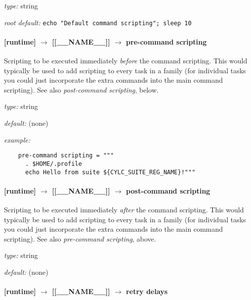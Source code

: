 \begin{myitemize}
\item {\em type:} string
\item {\em root default:} \lstinline=echo "Default command scripting"; sleep 10=
\end{myitemize}


\paragraph[pre-command scripting]{ [runtime] $\rightarrow$ [[\_\_NAME\_\_]] $\rightarrow$ pre-command scripting}

Scripting to be executed immediately {\em before} the command scripting.
This would typically be used to add scripting to every task in a family
(for individual tasks you could just incorporate the extra commands into
the main command scripting). See also {\em post-command scripting},
below.

\begin{myitemize}
\item {\em type:} string
\item {\em default:} (none)
\item {\em example:}
 \begin{lstlisting}
    pre-command scripting = """
      . $HOME/.profile
      echo Hello from suite ${CYLC_SUITE_REG_NAME}!"""
 \end{lstlisting}
\end{myitemize}

\paragraph[post-command scripting]{ [runtime] $\rightarrow$ [[\_\_NAME\_\_]] $\rightarrow$ post-command scripting}

Scripting to be executed immediately {\em after} the command scripting.
This would typically be used to add scripting to every task in a family
(for individual tasks you could just incorporate the extra commands into
the main command scripting). See also {\em pre-command scripting},
above.

\begin{myitemize}
\item {\em type:} string
\item {\em default:} (none)
\end{myitemize}

\paragraph[retry delays]{[runtime] $\rightarrow$ [[\_\_NAME\_\_]] $\rightarrow$ retry delays}
\label{RefRetries}

